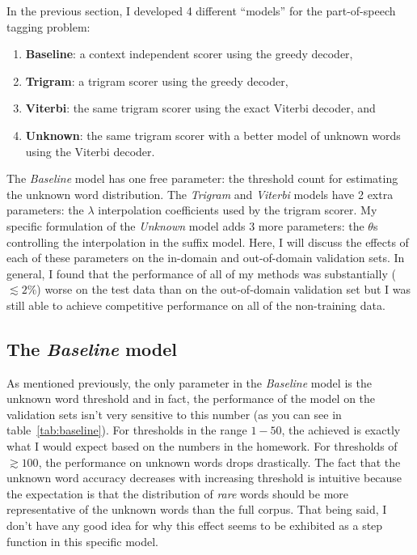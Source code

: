 \documentclass[11pt]{article}
\begin{document}
In the previous section, I developed 4 different ``models'' for the
part-of-speech tagging problem:
\begin{enumerate}
\item{{\bf Baseline}: a context independent scorer using the greedy
      decoder,}
\item{{\bf Trigram}: a trigram scorer using the greedy decoder,}
\item{{\bf Viterbi}: the same trigram scorer using the exact Viterbi decoder,
      and}
\item{{\bf Unknown}: the same trigram scorer with a better model of unknown
      words using the Viterbi decoder.}
\end{enumerate}
The \emph{Baseline} model has one free parameter: the threshold count for
estimating the unknown word distribution.
The \emph{Trigram} and \emph{Viterbi} models have 2 extra parameters: the
$\lambda$ interpolation coefficients used by the trigram scorer.
My specific formulation of the \emph{Unknown} model adds 3 more parameters:
the $\theta$s controlling the interpolation in the suffix model.
Here, I will discuss the effects of each of these parameters on the in-domain
and out-of-domain validation sets.
In general, I found that the performance of all of my methods was
substantially ($\lesssim 2\%$) worse on the test data than on the
out-of-domain validation set but I was still able to achieve competitive
performance on all of the non-training data.

\subsection{The \emph{Baseline} model}

As mentioned previously, the only parameter in the \emph{Baseline} model is
the unknown word threshold and in fact, the performance of the model on the
validation sets isn't very sensitive to this number (as you can see in
table~\ref{tab:baseline}).
For thresholds in the range $1-50$, the achieved is exactly what I would
expect based on the numbers in the homework.
For thresholds of $\gtrsim 100$, the performance on unknown words drops
drastically.
The fact that the unknown word accuracy decreases with increasing threshold
is intuitive because the expectation is that the distribution of \emph{rare}
words should be more representative of the unknown words than the full corpus.
That being said, I don't have any good idea for why this effect seems to be
exhibited as a step function in this specific model.
\end{document}
